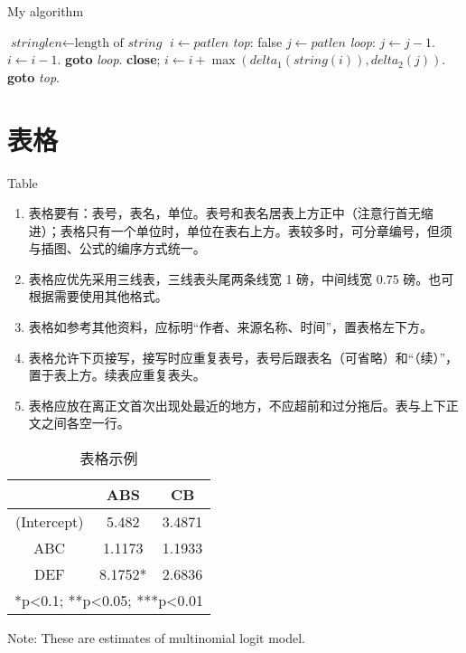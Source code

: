 \begin{algorithm}
	\caption{My algorithm}\label{euclid}
	\begin{algorithmic}[1]
		\State $\textit{stringlen} \gets \text{length of }\textit{string}$
		\State $i \gets \textit{patlen}$
		\BState \emph{top}:
		 \Return false
		\EndIf
		\State $j \gets \textit{patlen}$
		\BState \emph{loop}:
		\State $j \gets j-1$.
		\State $i \gets i-1$.
		\State \textbf{goto} \emph{loop}.
		\State \textbf{close};
		\EndIf
		\State $i \gets i+\max(\textit{delta}_1(\textit{string}(i)),\textit{delta}_2(j))$.
		\State \textbf{goto} \emph{top}.
		\EndProcedure
	\end{algorithmic}
\end{algorithm}


\section{表格}{Table}

\begin{enumerate}
	\item 表格要有：表号，表名，单位。表号和表名居表上方正中（注意行首无缩进）；表格只有一个单位时，单位在表右上方。表较多时，可分章编号，但须与插图、公式的编序方式统一。
	\item 表格应优先采用三线表，三线表头尾两条线宽 1 磅，中间线宽 0.75 磅。也可根据需要使用其他格式。
	\item 表格如参考其他资料，应标明“作者、来源名称、时间”，置表格左下方。
	\item 表格允许下页接写，接写时应重复表号，表号后跟表名（可省略）和“（续）”，置于表上方。续表应重复表头。
	\item 表格应放在离正文首次出现处最近的地方，不应超前和过分拖后。表与上下正文之间各空一行。
\end{enumerate}



\begin{table}[h!]
			\centering
	\begin{threeparttable}[b]
		\footnotesize
		\caption{表格示例}
		\begin{tabular}{ccc}
			\toprule
			& \multicolumn{1}{c}{ABS} & \multicolumn{1}{c}{CB} \\
			\midrule
			(Intercept) & 5.482 & 3.4871 \\
			ABC & 1.1173 & 1.1933 \\
			DEF & 8.1752* & 2.6836 \\
			\bottomrule
			\multicolumn{3}{c}{*p<0.1; **p<0.05; ***p<0.01} \\
			\bottomrule
		\end{tabular}%
		\label{tab:mlogit}%
		\begin{tablenotes}
			\footnotesize
			Note: These are estimates of multinomial logit model.
		\end{tablenotes}
	\end{threeparttable}
\end{table}%


